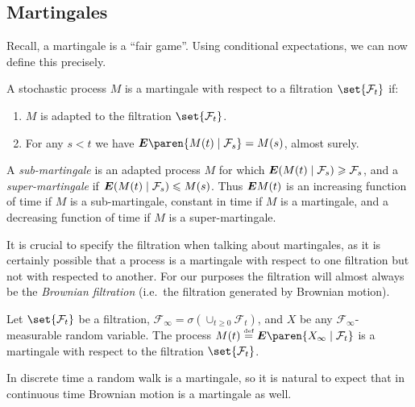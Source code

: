 \subsection{Martingales}

Recall, a martingale is a ``fair game''.
Using conditional expectations, we can now define this precisely.

\begin{definition}
  A stochastic process $M$ is a martingale with respect to a filtration $\set{\mathcal F_t}$ if:
  \begin{enumerate}
    \item
       $M$ is adapted to the filtration $\set{\mathcal F_t}$.
    \item
      For any $s < t$ we have $\E\paren{ M(t) \given \mathcal F_s} = M(s)$, almost surely.
  \end{enumerate}
\end{definition}
\begin{remark}
  A \emph{sub-martingale} is an adapted process $M$ for which $\E(M(t) \given \mathcal F_s) \geq \mathcal F_s$, and a \emph{super-martingale} if $\E( M(t) \given \mathcal F_s) \leq M(s)$.
  Thus $\bm{E} M(t)$ is an increasing function of time if $M$ is a sub-martingale, constant in time if $M$ is a martingale, and a decreasing function of time if $M$ is a super-martingale.
\end{remark}

\begin{remark}
  It is crucial to specify the filtration when talking about martingales, as it is certainly possible that a process is a martingale with respect to one filtration but not with respected to another.
  For our purposes the filtration will almost always be the \emph{Brownian filtration} (i.e.\ the filtration generated by Brownian motion).
\end{remark}

\begin{example}
  Let $\set{\mathcal F_t}$ be a filtration, $\mathcal F_\infty = \sigma( \cup_{t \geq 0} \mathcal F_t )$, and $X$ be any $\mathcal F_\infty$-measurable random variable.
  The process $M(t) \defeq \E\paren{ X_\infty \given \mathcal F_t }$ is a martingale with respect to the filtration $\set{\mathcal F_t}$.
\end{example}


In discrete time a random walk is a martingale, so it is natural to expect that in continuous time Brownian motion is a martingale as well.

